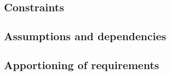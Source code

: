 \subsection{Constraints}

% 

\subsection{Assumptions and dependencies}


\subsection{Apportioning of requirements}

